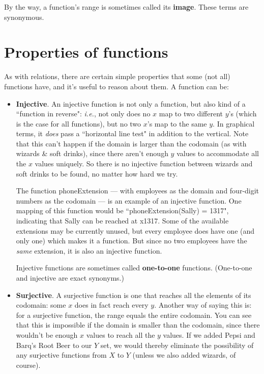 By the way, a function's range is sometimes called its \textbf{image}.
These terms are synonymous.


\section{Properties of functions}

As with relations, there are certain simple properties that some (not all)
functions have, and it's useful to reason about them. A function can be:

\begin{itemize}

\item \textbf{Injective}. An injective function is not only a function, but
also kind of a ``function in reverse": \textit{i.e.}, not only does no $x$
map to two different $y$'s (which is the case for all functions), but no
two $x$'s map to the same $y$. In graphical terms, it \textit{does} pass a
``horizontal line test" in addition to the vertical. Note that this can't
happen if the domain is larger than the codomain (as with wizards \& soft
drinks), since there aren't enough $y$ values to accommodate all the $x$
values uniquely. So there is no injective function between wizards and soft
drinks to be found, no matter how hard we try.

The function phoneExtension --- with employees as the domain and four-digit
numbers as the codomain --- is an example of an injective function. One
mapping of this function would be ``phoneExtension(Sally) = 1317",
indicating that Sally can be reached at x1317. Some of the available
extensions may be currently unused, but every employee does have one (and
only one) which makes it a function. But since no two employees have the
\textit{same} extension, it is also an injective function.

Injective functions are sometimes called \textbf{one-to-one} functions.
(One-to-one and injective are exact synonyms.)

\item \textbf{Surjective}. A surjective function is one that reaches all
the elements of its codomain: some $x$ does in fact reach every $y$.
Another way of saying this is: for a surjective function, the range equals
the entire codomain. You can see that this is impossible if the domain is
smaller than the codomain, since there wouldn't be enough $x$ values to
reach all the $y$ values. If we added Pepsi and Barq's Root Beer to our $Y$
set, we would thereby eliminate the possibility of any surjective functions
from $X$ to $Y$ (unless we also added wizards, of course).


\end{itemize}
